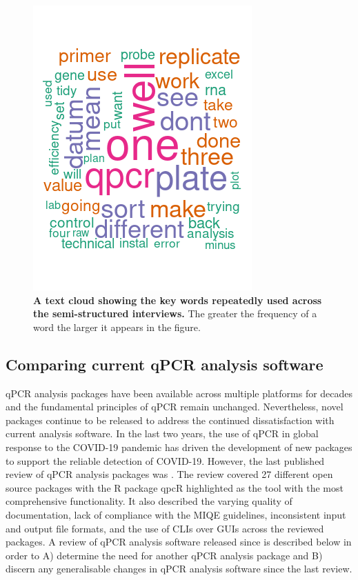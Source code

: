 \documentclass{SBCbookchapter}
\begin{document}
\begin{figure}[t]

{\centering \includegraphics[width=0.5\linewidth]{figures/mg_rb_ck_ec_db_semi_structured_word_cloud} 

}

\caption{\textbf{A text cloud showing the key words repeatedly used across the semi-structured interviews.} The greater the frequency of a word the larger it appears in the figure. }\label{fig:semi-structured-test-cloud}
\end{figure}

\subsection{Comparing current qPCR analysis software}

qPCR analysis packages have been available across multiple platforms for decades and the fundamental principles of qPCR remain unchanged.
Nevertheless, novel packages continue to be released to address the continued dissatisfaction with current analysis software.
In the last two years, the use of qPCR in global response to the COVID-19 pandemic has driven the development of new packages to support the reliable detection of COVID-19.
However, the last published review of qPCR analysis packages was \cite{Pabinger2014}.
The review covered 27 different open source packages with the R package qpcR highlighted as the tool with the most comprehensive functionality.
It also described the varying quality of documentation, lack of compliance with the MIQE guidelines, inconsistent input and output file formats, and the use of CLIs over GUIs across the reviewed packages.
A review of qPCR analysis software released since \cite{Pabinger2014} is described below in order to A) determine the need for another qPCR analysis package and B) discern any generalisable changes in qPCR analysis software since the last review.
\end{document}
